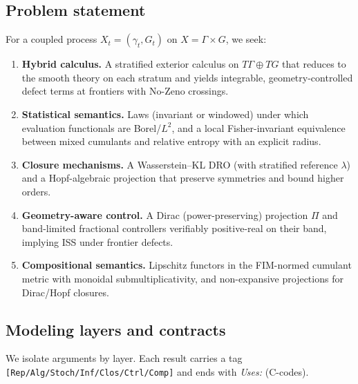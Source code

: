 \documentclass[10pt]{article}
\begin{document}
\subsection*{Problem statement}
For a coupled process $X_t=(\gamma_t,G_t)$ on $X=\Gamma\times G$, we seek:

\begin{enumerate}[label=(P\arabic*),leftmargin=*]
\item \textbf{Hybrid calculus.} A stratified exterior calculus on $T\Gamma\oplus TG$ that reduces to the smooth theory on each stratum and yields integrable, geometry-controlled defect terms at frontiers with No-Zeno crossings.
\item \textbf{Statistical semantics.} Laws (invariant or windowed) under which evaluation functionals are Borel/$L^2$, and a local Fisher-invariant equivalence between mixed cumulants and relative entropy with an explicit radius.
\item \textbf{Closure mechanisms.} A Wasserstein--KL DRO (with stratified reference $\lambda$) and a Hopf-algebraic projection that preserve symmetries and bound higher orders.
\item \textbf{Geometry-aware control.} A Dirac (power-preserving) projection $\Pi$ and band-limited fractional controllers verifiably positive-real on their band, implying ISS under frontier defects.
\item \textbf{Compositional semantics.} Lipschitz functors in the FIM-normed cumulant metric with monoidal submultiplicativity, and non-expansive projections for Dirac/Hopf closures.
\end{enumerate}

\subsection*{Modeling layers and contracts}
We isolate arguments by layer. Each result carries a tag \texttt{[Rep/Alg/Stoch/Inf/Clos/Ctrl/Comp]} and ends with \emph{Uses:} (C-codes).
\end{document}
